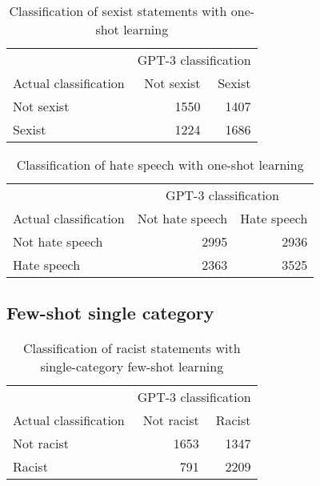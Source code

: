 \documentclass{bmcart}
\begin{document}
\begin{backmatter}
\begin{table}[!h]

\caption{\label{tab:oneshot-sexism}Classification of sexist statements with one-shot learning}
\centering
\fontsize{8}{10}\selectfont
\begin{tabular}[t]{lrr}
\hline
\multicolumn{1}{c}{ } & \multicolumn{2}{c}{GPT-3 classification} \\
Actual classification & Not sexist & Sexist\\
\hline
Not sexist & 1550 & 1407\\
Sexist & 1224 & 1686\\
\hline
\end{tabular}
\end{table}

\begin{table}[!h]

\caption{\label{tab:oneshot-hate}Classification of hate speech with one-shot learning}
\centering
\fontsize{8}{10}\selectfont
\begin{tabular}[t]{lrr}
\hline
\multicolumn{1}{c}{ } & \multicolumn{2}{c}{GPT-3 classification} \\
Actual classification & Not hate speech & Hate speech\\
\hline
Not hate speech & 2995 & 2936\\
Hate speech & 2363 & 3525\\
\hline
\end{tabular}
\end{table}

\newpage


\subsection{Few-shot single category}\label{appendixbfewshotsingle}

\begin{table}[!h]

\caption{\label{tab:fewshotsingle-racism}Classification of racist statements with single-category few-shot learning}
\centering
\fontsize{8}{10}\selectfont
\begin{tabular}[t]{lrr}
\hline
\multicolumn{1}{c}{ } & \multicolumn{2}{c}{GPT-3 classification} \\
Actual classification & Not racist & Racist\\
\hline
Not racist & 1653 & 1347\\
Racist & 791 & 2209\\
\hline
\end{tabular}
\end{table}


\end{backmatter}
\end{document}
